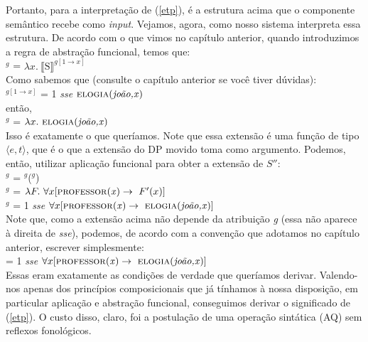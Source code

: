\bigskip

\n Portanto, para a interpretação de (\ref{etp}), é a estrutura
acima que o componente semântico recebe como \textit{input}.
Vejamos, agora, como nosso sistema interpreta essa estrutura. De
acordo com o que vimos no capítulo anterior, quando introduzimos a
regra de abstração funcional, temos que:\\

\n {}$^{g}$ = $\lambda x.\
\llbracket\text{S}\rrbracket^{g[1\rightarrow x]}$\\

\n Como sabemos que (consulte o capítulo anterior se você tiver dúvidas):\\

\n {}$^{g[1\rightarrow x]}$ = 1 \textit{sse} $\text{\textsc{elogia}(\textit{joão,x})}$\\

\n então,\\

\n {}$^{g}$ = $\lambda x.\ \predica{elogia}{joão,x}$\\

\n Isso é exatamente o que queríamos. Note que essa extensão é uma função de tipo $\langle
e,t\rangle$, que é o que a extensão do DP movido toma como
argumento. Podemos, então, utilizar aplicação funcional para obter a
extensão de $S''$:\\

\n{}$^{g}$ = $^{g}$($^{g}$)\\

\n{}$^{g}$ = $\lambda F.\ \forall x [\text{\textsc{professor}(\textit{x})} \rightarrow\ F'(x)]$\\

\n {}$^{g}$ = 1 \textit{sse} $\forall x [\predica{professor}{x} \rightarrow\ \predica{elogia}{joão,x}]$\\

\n Note que, como a extensão acima não depende da atribuição
\textit{g} (essa não aparece à direita de \textit{sse}), podemos,
de acordo com a convenção que adotamos no capítulo anterior,
escrever simplesmente:\\

\n {} = 1 \textit{sse} $\forall x [\predica{professor}{x} \rightarrow\ \predica{elogia}{joão,x}]$\\


\n Essas eram exatamente as condições de verdade que queríamos
derivar. Valendo-nos apenas dos princípios composicionais que já
tínhamos à nossa disposição, em particular aplicação e abstração funcional, conseguimos derivar o
significado de (\ref{etp}). O custo disso, claro, foi a postulação
de uma operação sintática (AQ) sem reflexos fonológicos.


